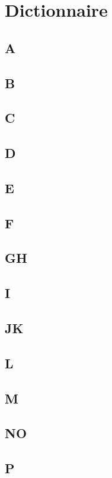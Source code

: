 \chapter{Dictionnaire}
\section{A}
%
\section{B}
%
\section{C}
%
\section{D}
%
\section{E}
%
\section{F}
%
\section{GH}
%

\section{I}

\section{JK}

\section{L}

\section{M}

\section{NO}

\section{P}

